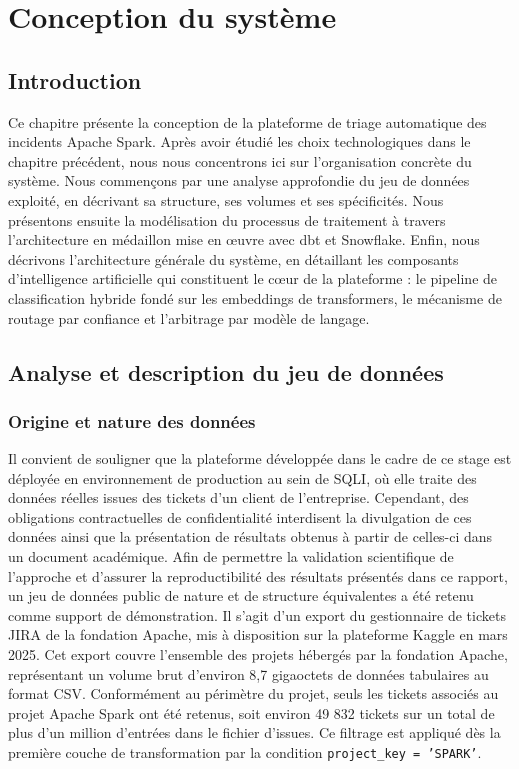 \chapter{Conception du système}

\lfoot{\leftmark}

\section{Introduction}
Ce chapitre présente la conception de la plateforme de triage automatique des incidents Apache Spark. Après avoir étudié les choix technologiques dans le chapitre précédent, nous nous concentrons ici sur l'organisation concrète du système. Nous commençons par une analyse approfondie du jeu de données exploité, en décrivant sa structure, ses volumes et ses spécificités. Nous présentons ensuite la modélisation du processus de traitement à travers l'architecture en médaillon mise en œuvre avec dbt et Snowflake. Enfin, nous décrivons l'architecture générale du système, en détaillant les composants d'intelligence artificielle qui constituent le cœur de la plateforme : le pipeline de classification hybride fondé sur les embeddings de transformers, le mécanisme de routage par confiance et l'arbitrage par modèle de langage.

\section{Analyse et description du jeu de données}

\subsection{Origine et nature des données}

Il convient de souligner que la plateforme développée dans le cadre de ce stage est déployée en environnement de production au sein de SQLI, où elle traite des données réelles issues des tickets d'un client de l'entreprise. Cependant, des obligations contractuelles de confidentialité interdisent la divulgation de ces données ainsi que la présentation de résultats obtenus à partir de celles-ci dans un document académique. Afin de permettre la validation scientifique de l'approche et d'assurer la reproductibilité des résultats présentés dans ce rapport, un jeu de données public de nature et de structure équivalentes a été retenu comme support de démonstration. Il s'agit d'un export du gestionnaire de tickets JIRA de la fondation Apache, mis à disposition sur la plateforme Kaggle en mars 2025. Cet export couvre l'ensemble des projets hébergés par la fondation Apache, représentant un volume brut d'environ 8,7 gigaoctets de données tabulaires au format CSV. Conformément au périmètre du projet, seuls les tickets associés au projet Apache Spark ont été retenus, soit environ 49 832 tickets sur un total de plus d'un million d'entrées dans le fichier d'issues. Ce filtrage est appliqué dès la première couche de transformation par la condition \texttt{project\_key = 'SPARK'}.

